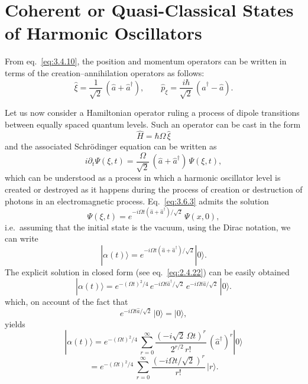 \section{Coherent or Quasi-Classical States of Harmonic Oscillators}
\label{sec:3.6}

From eq.~\eqref{eq:3.4.10}, the position and momentum operators
can be written in terms of the creation--annihilation operators as
follows:
\begin{equation}
\hat\xi=\frac{1}{\sqrt{2}}\,(\hat a+\hat a^\dagger),\qquad
\hat p_\xi=\frac{i\hbar}{\sqrt{2}}\,(\hat a^\dagger-\hat a).
\label{eq:3.6.1}
\end{equation}

Let us now consider a Hamiltonian operator ruling a process of
dipole transitions between equally spaced quantum levels. Such an
operator can be cast in the form
\begin{equation}
\hat H=\hbar\Omega\,\hat\xi
\label{eq:3.6.2}
\end{equation}
and the associated Schr\"odinger equation can be written as
\begin{equation}
i\partial_t\Psi(\xi,t)=\frac{\Omega}{\sqrt{2}}\,(\hat a+\hat a^\dagger)\,\Psi(\xi,t),
\label{eq:3.6.3}
\end{equation}
which can be understood as a process in which a harmonic
oscillator level is created or destroyed as it happens during the
process of creation or destruction of photons in an electromagnetic
process. Eq.~\eqref{eq:3.6.3} admits the solution
\begin{equation}
\Psi(\xi,t)=e^{-i\Omega t(\hat a+\hat a^\dagger)/\sqrt{2}}\,\Psi(x,0),
\label{eq:3.6.4}
\end{equation}
i.e.\ assuming that the initial state is the vacuum, using the Dirac
notation, we can write
\begin{equation}
|\alpha(t)\rangle=
e^{-i\Omega t(\hat a+\hat a^\dagger)/\sqrt{2}}|0\rangle.
\label{eq:3.6.5}
\end{equation}
The explicit solution in closed form (see eq.~\eqref{eq:2.4.22}) can
be easily obtained
\begin{equation}
|\alpha(t)\rangle=
e^{-(\Omega t)^2/4}\,
e^{-i\Omega t\hat a^\dagger/\sqrt{2}}\,
e^{-i\Omega t\hat a/\sqrt{2}}\,|0\rangle.
\label{eq:3.6.6}
\end{equation}
which, on account of the fact that
\begin{equation}
e^{-i\Omega t\hat a/\sqrt{2}}\,|0\rangle=|0\rangle,
\label{eq:3.6.7}
\end{equation}
yields
\[
|\alpha(t)\rangle=
e^{-(\Omega t)^2/4}\,
\sum_{r=0}^{\infty}\frac{(-i\sqrt{2}\,\Omega t)^r}{2^{r/2}\,r!}\,
(\hat a^\dagger)^r|0\rangle
\]
\begin{equation}
=e^{-(\Omega t)^2/4}\,
\sum_{r=0}^{\infty}\frac{(-i\Omega t/\sqrt{2})^r}{r!}\,
|r\rangle.
\label{eq:3.6.8}
\end{equation}

